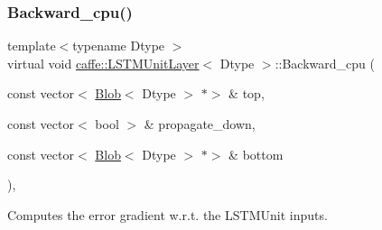 \subsubsection{\texorpdfstring{Backward\+\_\+cpu()}{Backward\_cpu()}\hspace{0.1cm}{\footnotesize\ttfamily [2/2]}}
{\footnotesize\ttfamily template$<$typename Dtype $>$ \\
virtual void \mbox{\hyperlink{classcaffe_1_1_l_s_t_m_unit_layer}{caffe\+::\+L\+S\+T\+M\+Unit\+Layer}}$<$ Dtype $>$\+::Backward\+\_\+cpu (\begin{DoxyParamCaption}\item[{const vector$<$ \mbox{\hyperlink{classcaffe_1_1_blob}{Blob}}$<$ Dtype $>$ $\ast$$>$ \&}]{top,  }\item[{const vector$<$ bool $>$ \&}]{propagate\+\_\+down,  }\item[{const vector$<$ \mbox{\hyperlink{classcaffe_1_1_blob}{Blob}}$<$ Dtype $>$ $\ast$$>$ \&}]{bottom }\end{DoxyParamCaption})\hspace{0.3cm}{\ttfamily [protected]}, {\ttfamily [virtual]}}



Computes the error gradient w.\+r.\+t. the L\+S\+T\+M\+Unit inputs. 


